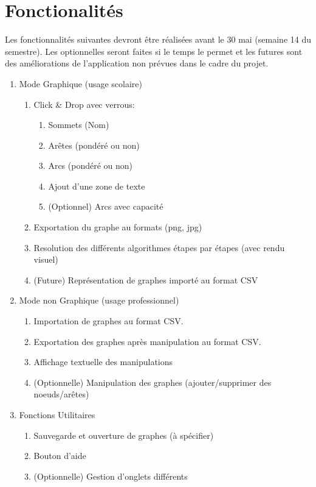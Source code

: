 \documentclass[french]{article}
\begin{document}
	\section{Fonctionalités}
		Les fonctionnalités suivantes devront être réalisées avant le 30 mai (semaine 14 du semestre). Les optionnelles seront faites si le temps le permet et les futures sont des améliorations de l'application non prévues dans le cadre du projet.
		\begin{enumerate}
			\item Mode Graphique (usage scolaire)
			\begin{enumerate}
        \item Click \& Drop avec verrous:
        \begin{enumerate}
          \item Sommets (Nom)
          \item Arêtes (pondéré ou non)
          \item Arcs (pondéré ou non)
          \item Ajout d'une zone de texte
          \item (Optionnel) Arcs avec capacité
        \end{enumerate}
				\item Exportation du graphe au formats (png, jpg)
        \item Resolution des différents algorithmes étapes par étapes (avec rendu visuel)
        \item (Future) Représentation de graphes importé au format CSV
			 \end{enumerate}

		   \item Mode non Graphique (usage professionnel)
       \begin{enumerate}
 				\item Importation de graphes au format CSV.
 				\item Exportation des graphes après manipulation au format CSV.
        \item Affichage textuelle des manipulations
 				\item (Optionnelle) Manipulation des graphes (ajouter/supprimer des noeuds/arêtes)
 			\end{enumerate}

      \item Fonctions Utilitaires
			\begin{enumerate}
				\item Sauvegarde et ouverture de graphes (à spécifier)
				\item Bouton d'aide
				\item (Optionnelle) Gestion d'onglets différents
			\end{enumerate}
		\end{enumerate}
\end{document}
